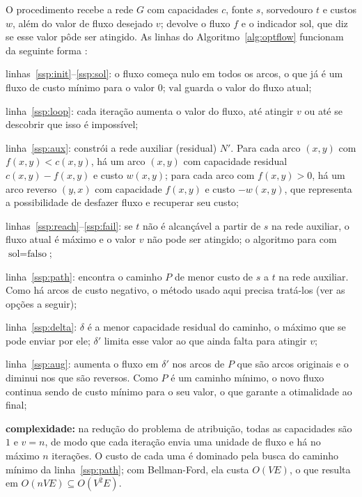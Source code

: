 O procedimento recebe a rede $G$ com capacidades $c$, fonte $s$, sorvedouro $t$ e custos $w$, além do valor de fluxo desejado $v$; devolve o fluxo $f$ e o indicador $\text{sol}$, que diz se esse valor pôde ser atingido. As linhas do Algoritmo~\ref{alg:optflow} funcionam da seguinte forma \cite{jungnickel}:

\begin{alineas}
    \item linhas~\ref{ssp:init}--\ref{ssp:sol}: o fluxo começa nulo em todos os arcos, o que já é um fluxo de custo mínimo para o valor $0$; $\text{val}$ guarda o valor do fluxo atual;
    \item linha~\ref{ssp:loop}: cada iteração aumenta o valor do fluxo, até atingir $v$ ou até se descobrir que isso é impossível;
    \item linha~\ref{ssp:aux}: constrói a rede auxiliar (residual) $N'$. Para cada arco $(x,y)$ com $f(x,y) < c(x,y)$, há um arco $(x,y)$ com capacidade residual $c(x,y) - f(x,y)$ e custo $w(x,y)$; para cada arco com $f(x,y) > 0$, há um arco reverso $(y,x)$ com capacidade $f(x,y)$ e custo $-w(x,y)$, que representa a possibilidade de desfazer fluxo e recuperar seu custo;
    \item linhas~\ref{ssp:reach}--\ref{ssp:fail}: se $t$ não é alcançável a partir de $s$ na rede auxiliar, o fluxo atual é máximo e o valor $v$ não pode ser atingido; o algoritmo para com $\text{sol} = \text{falso}$;
    \item linha~\ref{ssp:path}: encontra o caminho $P$ de menor custo de $s$ a $t$ na rede auxiliar. Como há arcos de custo negativo, o método usado aqui precisa tratá-los (ver as opções a seguir);
    \item linha~\ref{ssp:delta}: $\delta$ é a menor capacidade residual do caminho, o máximo que se pode enviar por ele; $\delta'$ limita esse valor ao que ainda falta para atingir $v$;
    \item linha~\ref{ssp:aug}: aumenta o fluxo em $\delta'$ nos arcos de $P$ que são arcos originais e o diminui nos que são reversos. Como $P$ é um caminho mínimo, o novo fluxo continua sendo de custo mínimo para o seu valor, o que garante a otimalidade ao final;
    \item \textbf{complexidade:} na redução do problema de atribuição, todas as capacidades são $1$ e $v = n$, de modo que cada iteração envia uma unidade de fluxo e há no máximo $n$ iterações. O custo de cada uma é dominado pela busca do caminho mínimo da linha~\ref{ssp:path}; com Bellman-Ford, ela custa $O(VE)$, o que resulta em $O(nVE) \subseteq O(V^2 E)$.
\end{alineas}

